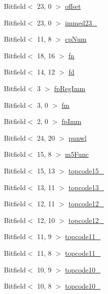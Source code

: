 \begin{DoxyCompactItemize}
\item 
Bitfield$<$ 23, 0 $>$ \hyperlink{namespaceArmISA_a87b7a740701cddafb930a9460e9f4eba}{offset}
\item 
Bitfield$<$ 23, 0 $>$ \hyperlink{namespaceArmISA_acb45b184a88ad19f439462790014b246}{immed23\_}
\item 
Bitfield$<$ 11, 8 $>$ \hyperlink{namespaceArmISA_a0657570b02e5e29a889e0a590778bf43}{cpNum}
\item 
Bitfield$<$ 18, 16 $>$ \hyperlink{namespaceArmISA_ae91a4299b82057b65dacc2999095d212}{fn}
\item 
Bitfield$<$ 14, 12 $>$ \hyperlink{namespaceArmISA_a87001e8063b8b1b5dc88f5a4b43b2a5a}{fd}
\item 
Bitfield$<$ 3 $>$ \hyperlink{namespaceArmISA_ae63128a81918d59ad932280b2f63e2af}{fpRegImm}
\item 
Bitfield$<$ 3, 0 $>$ \hyperlink{namespaceArmISA_a4b41b68f8ad3209e51e469d5a862f075}{fm}
\item 
Bitfield$<$ 2, 0 $>$ \hyperlink{namespaceArmISA_a26e1d8374adad135f57140b332ce9dce}{fpImm}
\item 
Bitfield$<$ 24, 20 $>$ \hyperlink{namespaceArmISA_af12c968524b0b213d5d874ec8e48b20b}{punwl}
\item 
Bitfield$<$ 15, 8 $>$ \hyperlink{namespaceArmISA_a542df051f0e56996e5ce0aeb58cffef6}{m5Func}
\item 
Bitfield$<$ 15, 13 $>$ \hyperlink{namespaceArmISA_a3ded64bf19ed15753e7b66379d206196}{topcode15\_}
\item 
Bitfield$<$ 13, 11 $>$ \hyperlink{namespaceArmISA_a710b1308784d265dac41e0a6832401df}{topcode13\_}
\item 
Bitfield$<$ 12, 11 $>$ \hyperlink{namespaceArmISA_ac1194c135fa15f04a811c31a8c42437a}{topcode12\_}
\item 
Bitfield$<$ 12, 10 $>$ \hyperlink{namespaceArmISA_a159080e3f96e003fb4a49728cf319ed2}{topcode12\_}
\item 
Bitfield$<$ 11, 9 $>$ \hyperlink{namespaceArmISA_a088778a1bc10cd61d3a0e1ed55787a72}{topcode11\_}
\item 
Bitfield$<$ 11, 8 $>$ \hyperlink{namespaceArmISA_a698a6d409eb82b7e537014b4eb6c9bd5}{topcode11\_}
\item 
Bitfield$<$ 10, 9 $>$ \hyperlink{namespaceArmISA_aee80d2a2eea631c14fab55175753c7c2}{topcode10\_}
\item 
Bitfield$<$ 10, 8 $>$ \hyperlink{namespaceArmISA_abda1b25f088130595b4c623ad38839a8}{topcode10\_}
\item 

\end{DoxyCompactItemize}
